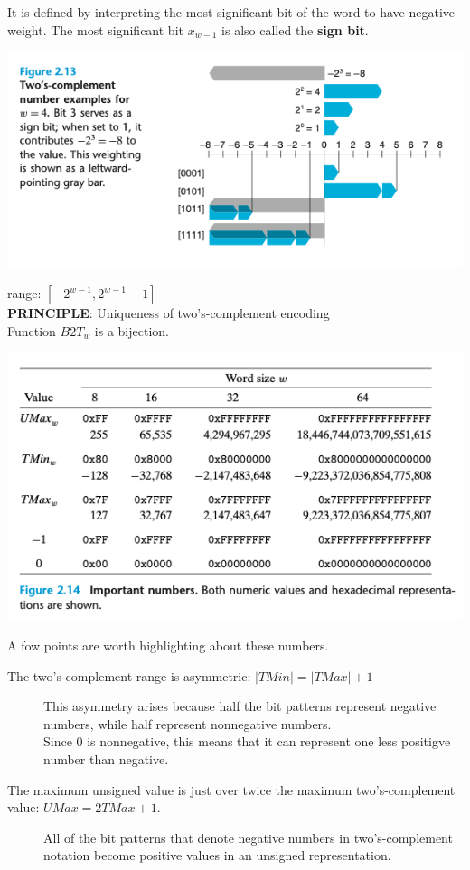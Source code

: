 \documentclass[11pt]{article}
\begin{document}
It is defined by interpreting the most significant bit of the word to have negative weight. The most significant bit \(x_{w-1}\) is also called the \textbf{sign bit}.\\


\begin{center}
\includegraphics[width=.9\linewidth]{pics/two's-complement-example.png}
\end{center}


range: \([-2^{w-1}, 2^{w-1}-1]\)\\



\textbf{PRINCIPLE}: Uniqueness of two's-complement encoding\\
Function \(B2T_w\) is a bijection.\\


\begin{center}
\includegraphics[width=.9\linewidth]{pics/important-numbers.png}
\end{center}

A fow points are worth highlighting about these numbers.\\
\begin{description}
\item[{The two's-complement range is asymmetric: \(|TMin| = |TMax|+1\)}] This asymmetry arises because half the bit patterns represent negative numbers, while half represent nonnegative numbers.\\
Since 0 is nonnegative, this means that it can represent one less positigve number than negative.\\
\item[{The maximum unsigned value is just over twice the maximum two's-complement value: \(UMax = 2TMax + 1\).}] All of the bit patterns that denote negative numbers in two’s-complement notation become positive values in an unsigned representation.\\
\end{description}
\end{document}
